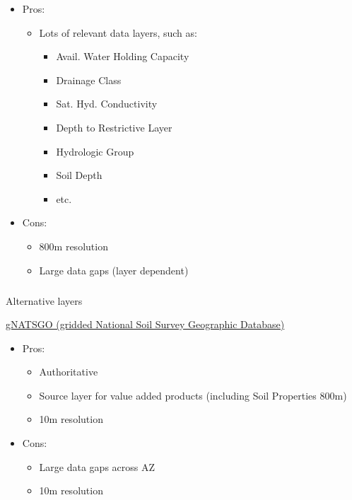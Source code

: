 \documentclass[
]{agujournal2019}
\makeatletter
\let\oldsubparagraph\subparagraph
\renewcommand{\subparagraph}{
    \@ifstar
      \xxxSubParagraphStar
      \xxxSubParagraphNoStar
  }
\newcommand{\xxxSubParagraphStar}[1]{\oldsubparagraph*{#1}\mbox{}}
\newcommand{\xxxSubParagraphNoStar}[1]{\oldsubparagraph{#1}\mbox{}}
\providecommand{\tightlist}{%
  \setlength{\itemsep}{0pt}\setlength{\parskip}{0pt}}\usepackage{longtable,booktabs,array}
\makeatother
\begin{document}
\begin{itemize}
\tightlist
\item
  Pros:

  \begin{itemize}
  \tightlist
  \item
    Lots of relevant data layers, such as:

    \begin{itemize}
    \tightlist
    \item
      Avail. Water Holding Capacity
    \item
      Drainage Class
    \item
      Sat. Hyd. Conductivity
    \item
      Depth to Restrictive Layer
    \item
      Hydrologic Group
    \item
      Soil Depth
    \item
      etc.
    \end{itemize}
  \end{itemize}
\item
  Cons:

  \begin{itemize}
  \tightlist
  \item
    800m resolution
  \item
    Large data gaps (layer dependent)
  \end{itemize}
\end{itemize}

\subparagraph{Alternative layers}\label{alternative-layers}

\href{https://gee-community-catalog.org/projects/gnatsgo/}{gNATSGO
(gridded National Soil Survey Geographic Database)}

\begin{itemize}
\tightlist
\item
  Pros:

  \begin{itemize}
  \tightlist
  \item
    Authoritative
  \item
    Source layer for value added products (including Soil Properties
    800m)
  \item
    10m resolution
  \end{itemize}
\item
  Cons:

  \begin{itemize}
  \tightlist
  \item
    Large data gaps across AZ
  \item
    10m resolution
  \end{itemize}
\end{itemize}
\end{document}
